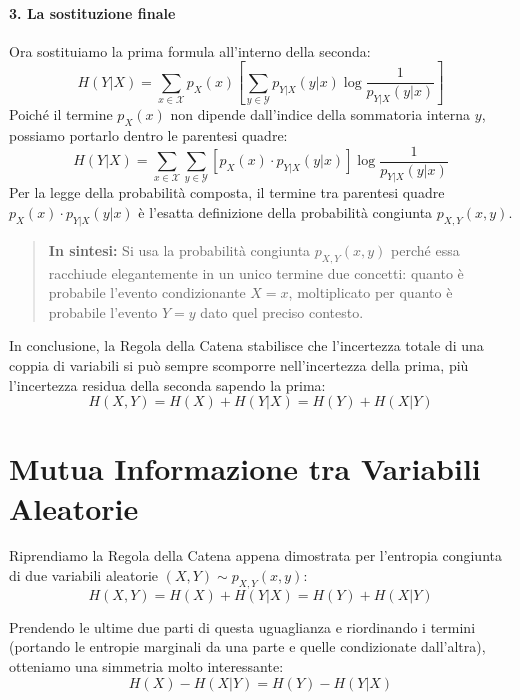 \paragraph{3. La sostituzione finale}
Ora sostituiamo la prima formula all'interno della seconda:
\begin{equation}
H(Y|X) = \sum_{x \in \mathcal{X}} p_X(x) \left[ \sum_{y \in \mathcal{Y}} p_{Y|X}(y|x) \log \frac{1}{p_{Y|X}(y|x)} \right]
\end{equation}
Poiché il termine $p_X(x)$ non dipende dall'indice della sommatoria interna $y$, possiamo portarlo dentro le parentesi quadre:
\begin{equation}
H(Y|X) = \sum_{x \in \mathcal{X}} \sum_{y \in \mathcal{Y}} \left[ p_X(x) \cdot p_{Y|X}(y|x) \right] \log \frac{1}{p_{Y|X}(y|x)}
\end{equation}
Per la legge della probabilità composta, il termine tra parentesi quadre $p_X(x) \cdot p_{Y|X}(y|x)$ è l'esatta definizione della probabilità congiunta $p_{X,Y}(x,y)$.

\begin{quote}
\textbf{In sintesi:} Si usa la probabilità congiunta $p_{X,Y}(x,y)$ perché essa racchiude elegantemente in un unico termine due concetti: quanto è probabile l'evento condizionante $X=x$, moltiplicato per quanto è probabile l'evento $Y=y$ dato quel preciso contesto.
\end{quote}

In conclusione, la Regola della Catena stabilisce che l'incertezza totale di una coppia di variabili si può sempre scomporre nell'incertezza della prima, più l'incertezza residua della seconda sapendo la prima:
\begin{equation}
\boxed{ H(X,Y) = H(X) + H(Y|X) = H(Y) + H(X|Y) }
\end{equation}

\section{Mutua Informazione tra Variabili Aleatorie}

Riprendiamo la Regola della Catena appena dimostrata per l'entropia congiunta di due variabili aleatorie $(X, Y) \sim p_{X,Y}(x,y)$:
\begin{equation*}
    H(X, Y) = H(X) + H(Y|X) = H(Y) + H(X|Y)
\end{equation*}

Prendendo le ultime due parti di questa uguaglianza e riordinando i termini (portando le entropie marginali da una parte e quelle condizionate dall'altra), otteniamo una simmetria molto interessante:
\begin{equation}
    H(X) - H(X|Y) = H(Y) - H(Y|X)
\end{equation}

